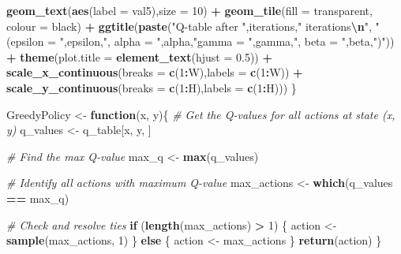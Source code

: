 \documentclass[
]{article}
\newenvironment{Shaded}{\begin{snugshade}}{\end{snugshade}}
\newcommand{\AttributeTok}[1]{\textcolor[rgb]{0.13,0.29,0.53}{#1}}
\newcommand{\CommentTok}[1]{\textcolor[rgb]{0.56,0.35,0.01}{\textit{#1}}}
\newcommand{\ControlFlowTok}[1]{\textcolor[rgb]{0.13,0.29,0.53}{\textbf{#1}}}
\newcommand{\DecValTok}[1]{\textcolor[rgb]{0.00,0.00,0.81}{#1}}
\newcommand{\FloatTok}[1]{\textcolor[rgb]{0.00,0.00,0.81}{#1}}
\newcommand{\FunctionTok}[1]{\textcolor[rgb]{0.13,0.29,0.53}{\textbf{#1}}}
\newcommand{\NormalTok}[1]{#1}
\newcommand{\OtherTok}[1]{\textcolor[rgb]{0.56,0.35,0.01}{#1}}
\newcommand{\SpecialCharTok}[1]{\textcolor[rgb]{0.81,0.36,0.00}{\textbf{#1}}}
\newcommand{\StringTok}[1]{\textcolor[rgb]{0.31,0.60,0.02}{#1}}
\begin{document}
\begin{Shaded}
\begin{Highlighting}[]
          \FunctionTok{geom\_text}\NormalTok{(}\FunctionTok{aes}\NormalTok{(}\AttributeTok{label =}\NormalTok{ val5),}\AttributeTok{size =} \DecValTok{10}\NormalTok{) }\SpecialCharTok{+}
          \FunctionTok{geom\_tile}\NormalTok{(}\AttributeTok{fill =} \StringTok{\textquotesingle{}transparent\textquotesingle{}}\NormalTok{, }\AttributeTok{colour =} \StringTok{\textquotesingle{}black\textquotesingle{}}\NormalTok{) }\SpecialCharTok{+} 
          \FunctionTok{ggtitle}\NormalTok{(}\FunctionTok{paste}\NormalTok{(}\StringTok{"Q{-}table after "}\NormalTok{,iterations,}\StringTok{" iterations}\SpecialCharTok{\textbackslash{}n}\StringTok{"}\NormalTok{,}
                        \StringTok{"(epsilon = "}\NormalTok{,epsilon,}\StringTok{", alpha = "}\NormalTok{,alpha,}\StringTok{"gamma = "}\NormalTok{,gamma,}\StringTok{", beta = "}\NormalTok{,beta,}\StringTok{")"}\NormalTok{)) }\SpecialCharTok{+}
          \FunctionTok{theme}\NormalTok{(}\AttributeTok{plot.title =} \FunctionTok{element\_text}\NormalTok{(}\AttributeTok{hjust =} \FloatTok{0.5}\NormalTok{)) }\SpecialCharTok{+}
          \FunctionTok{scale\_x\_continuous}\NormalTok{(}\AttributeTok{breaks =} \FunctionTok{c}\NormalTok{(}\DecValTok{1}\SpecialCharTok{:}\NormalTok{W),}\AttributeTok{labels =} \FunctionTok{c}\NormalTok{(}\DecValTok{1}\SpecialCharTok{:}\NormalTok{W)) }\SpecialCharTok{+}
          \FunctionTok{scale\_y\_continuous}\NormalTok{(}\AttributeTok{breaks =} \FunctionTok{c}\NormalTok{(}\DecValTok{1}\SpecialCharTok{:}\NormalTok{H),}\AttributeTok{labels =} \FunctionTok{c}\NormalTok{(}\DecValTok{1}\SpecialCharTok{:}\NormalTok{H)))}
\NormalTok{\}}

\NormalTok{GreedyPolicy }\OtherTok{\textless{}{-}} \ControlFlowTok{function}\NormalTok{(x, y)\{}
  \CommentTok{\# Get the Q{-}values for all actions at state (x, y)}
\NormalTok{  q\_values }\OtherTok{\textless{}{-}}\NormalTok{ q\_table[x, y, ]}
  
  \CommentTok{\# Find the max Q{-}value}
\NormalTok{  max\_q }\OtherTok{\textless{}{-}} \FunctionTok{max}\NormalTok{(q\_values)}
  
  \CommentTok{\# Identify all actions with maximum Q{-}value}
\NormalTok{  max\_actions }\OtherTok{\textless{}{-}} \FunctionTok{which}\NormalTok{(q\_values }\SpecialCharTok{==}\NormalTok{ max\_q)}
  
  \CommentTok{\# Check and resolve ties}
  \ControlFlowTok{if}\NormalTok{ (}\FunctionTok{length}\NormalTok{(max\_actions) }\SpecialCharTok{\textgreater{}} \DecValTok{1}\NormalTok{) \{}
\NormalTok{    action }\OtherTok{\textless{}{-}} \FunctionTok{sample}\NormalTok{(max\_actions, }\DecValTok{1}\NormalTok{)}
\NormalTok{  \} }\ControlFlowTok{else}\NormalTok{ \{}
\NormalTok{    action }\OtherTok{\textless{}{-}}\NormalTok{ max\_actions}
\NormalTok{  \}}
  \FunctionTok{return}\NormalTok{(action)}
\NormalTok{\}}


\end{Highlighting}
\end{Shaded}
\end{document}
